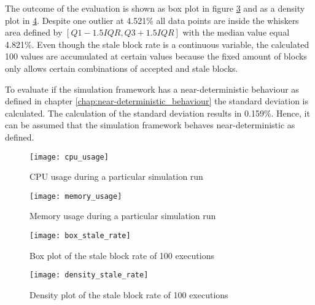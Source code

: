 The outcome of the evaluation is shown as box plot in figure \ref{fig:box_stale_rate} and as a density plot in \ref{fig:density_stale_rate}.
Despite one outlier at 4.521\% all data points are inside the whiskers area defined by $[Q1 - 1.5IQR, Q3 + 1.5IQR]$ with the median value equal 4.821\%.
Even though the stale block rate is a continuous variable, the calculated 100 values are accumulated at certain values because the fixed amount of blocks only allows certain combinations of accepted and stale blocks.

To evaluate if the simulation framework has a near-deterministic behaviour as defined in chapter \ref{chap:near-deterministic_behaviour} the standard deviation is calculated.
The calculation of the standard deviation results in 0.159\%.
Hence, it can be assumed that the simulation framework behaves near-deterministic as defined.

\begin{figure}[t]
\texttt{[image: cpu\_usage]}
\centering
\caption{CPU usage during a particular simulation run}
\label{fig:cpu_usage}
\end{figure}

\begin{figure}[t]
\texttt{[image: memory\_usage]}
\centering
\caption{Memory usage during a particular simulation run}
\label{fig:storage_usage}
\end{figure}

\begin{figure}[t]
\texttt{[image: box\_stale\_rate]}
\centering
\caption{Box plot of the stale block rate of 100 executions}
\label{fig:box_stale_rate}
\end{figure}

\begin{figure}[t]
\texttt{[image: density\_stale\_rate]}
\centering
\caption{Density plot of the stale block rate of 100 executions}
\label{fig:density_stale_rate}
\end{figure}
